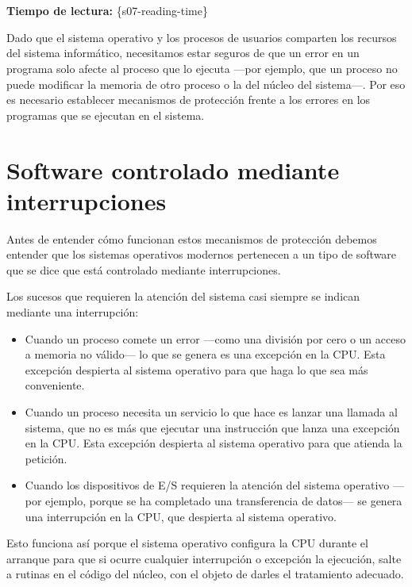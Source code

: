 \section{}

\textbf{Tiempo de lectura:} \{s07-reading-time\}

Dado que el sistema operativo y los procesos de usuarios comparten los
recursos del sistema informático, necesitamos estar seguros de que un
error en un programa solo afecte al proceso que lo ejecuta ---por
ejemplo, que un proceso no puede modificar la memoria de otro proceso o
la del núcleo del sistema---. Por eso es necesario establecer mecanismos
de protección frente a los errores en los programas que se ejecutan en
el sistema.

\section{Software controlado mediante
interrupciones}\label{_software_controlado_mediante_interrupciones}

Antes de entender cómo funcionan estos mecanismos de protección debemos
entender que los sistemas operativos modernos pertenecen a un tipo de
software que se dice que está controlado mediante interrupciones.

Los sucesos que requieren la atención del sistema casi siempre se
indican mediante una interrupción:

\begin{itemize}
\item
  Cuando un proceso comete un error ---como una división por cero o un
  acceso a memoria no válido--- lo que se genera es una excepción en la
  CPU. Esta excepción despierta al sistema operativo para que haga lo
  que sea más conveniente.
\item
  Cuando un proceso necesita un servicio lo que hace es lanzar una
  llamada al sistema, que no es más que ejecutar una instrucción que
  lanza una excepción en la CPU. Esta excepción despierta al sistema
  operativo para que atienda la petición.
\item
  Cuando los dispositivos de E/S requieren la atención del sistema
  operativo ---por ejemplo, porque se ha completado una transferencia de
  datos--- se genera una interrupción en la CPU, que despierta al
  sistema operativo.
\end{itemize}

Esto funciona así porque el sistema operativo configura la CPU durante
el arranque para que si ocurre cualquier interrupción o excepción la
ejecución, salte a rutinas en el código del núcleo, con el objeto de
darles el tratamiento adecuado.

